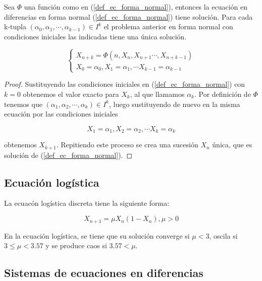 \begin{theorem}
Sea $\Phi$ una función como en (\ref{def_ec_forma_normal}), entonces la ecuación en diferencias en forma normal (\ref{def_ec_forma_normal}) tiene solución.
Para cada k-tupla $(\alpha_0, \alpha_1, \cdots ,\alpha_{k-1})\in I^{k}$ el problema anterior en forma normal con condiciones iniciales las indicadas tiene una única solución.

\begin{equation}
\begin{cases}
X_{n+k} = \Phi (n, X_n, X_{n+1}\cdots , X_{n+k-1}) \\
X_0 = \alpha_0, X_1=\alpha_1, \cdots X_{k-1}=\alpha_{k-1}
\end {cases}
\end{equation}

\end{theorem}
\begin{proof}
Sustituyendo las condiciones iniciales en (\ref{def_ec_forma_normal}) con $k=0$ obtenemos el valor exacto para $X_k$, al que llamamos $\alpha_k$. Por definición de $\Phi$ tenemos que $(\alpha_1, \alpha_2, \cdots ,\alpha_{k})\in I^{k}$, luego sustituyendo de nuevo en la misma ecuación por las condiciones iniciales

$$X_1 = \alpha_1, X_2=\alpha_2, \cdots X_{k}=\alpha_{k}$$

obtenemos $X_{k+1}$. Repitiendo este proceso se crea una sucesión $X_n$ única, que es solución de (\ref{def_ec_forma_normal}).
\end{proof}


\subsection{Ecuación logística}

\begin{definition}
La ecuacón logística discreta tiene la siguiente forma:

$$X_{n+1} = \mu X_n(1-X_n), \mu > 0$$
\end{definition}

\begin{proposition}
En la ecuación logística, se tiene que su solución converge si $\mu < 3$, oscila si $3\leq \mu < 3.57$ y se produce caos si $3.57 < \mu$. 
\end{proposition}

\subsection{Sistemas de ecuaciones en diferencias}

